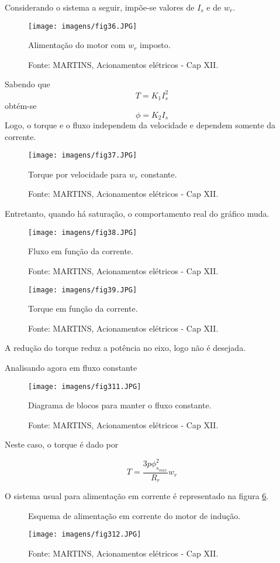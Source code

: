 Considerando o sistema a seguir, impõe-se valores de $ I_s$ e de $ w_r $.

\begin{figure}[ht!]
\center
\texttt{[image: imagens/fig36.JPG]}
\caption{\label{fig:fig36}Alimentação do motor com $ w_r$ imposto.}
\caption*{Fonte: MARTINS, Acionamentos elétricos - Cap XII.}
\end{figure}

Sabendo que
\[T = K_1 I_s^2\]
obtém-se
\[  \phi = K_2I_s \]
Logo, o torque e o fluxo independem da velocidade e dependem somente da corrente.

\begin{figure}[ht!]
\center
\texttt{[image: imagens/fig37.JPG]}
\caption{\label{fig:fig37}Torque por velocidade para $  w_r $ constante.}
\caption*{Fonte: MARTINS, Acionamentos elétricos - Cap XII.}
\end{figure}

Entretanto, quando há saturação, o comportamento real do gráfico muda.

\begin{figure}[ht!]
\center
\texttt{[image: imagens/fig38.JPG]}
\caption{\label{fig:fig38} Fluxo em função da corrente.}
\caption*{Fonte: MARTINS, Acionamentos elétricos - Cap XII.}
\end{figure}

\begin{figure}[ht!]
\center
\texttt{[image: imagens/fig39.JPG]}
\caption{\label{fig:fig39} Torque em função da corrente.}
\caption*{Fonte: MARTINS, Acionamentos elétricos - Cap XII.}
\end{figure}

A redução do torque reduz a potência no eixo, logo não é desejada.

Analisando agora em fluxo constante

\begin{figure}[ht!]
\center
\texttt{[image: imagens/fig311.JPG]}
\caption{\label{fig:fig311} Diagrama de blocos para manter o fluxo constante.}
\caption*{Fonte: MARTINS, Acionamentos elétricos - Cap XII.}
\end{figure}

Neste caso, o torque é dado por

\[  T = \frac{3p\phi _{s_{max}}^2}{R_r}w_r \]

O sistema usual para alimentação em corrente é representado na figura \ref{fig:fig312}.

\begin{figure}[ht!]
\center
\caption{\label{fig:fig312}Esquema de alimentação em corrente do motor de indução.}
\texttt{[image: imagens/fig312.JPG]}
\caption*{Fonte: MARTINS, Acionamentos elétricos - Cap XII.}
\end{figure}

